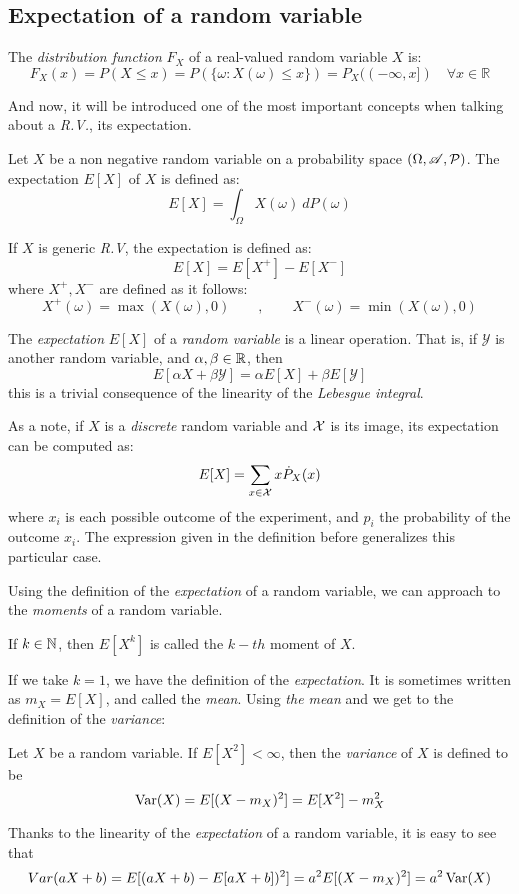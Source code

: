 \subsection{Expectation of a random variable}

\begin{ndef}
The \emph{distribution function } $F_X$ of a real-valued random variable $X$ is:
$$
F_X(x) = P(X \leq x) = P(\{\omega : X(\omega) \leq x\}) = P_X((-\infty,x]) \quad \forall x \in \mathbb R
$$
\end{ndef}

And now, it will be introduced one of the most important concepts when talking about a \emph{R.V.}, its expectation.

\begin{ndef}
Let $X$ be a non negative random variable on a probability space $(\Omega,\mathscr{A},\mathcal{P})$. The expectation $E[X]$ of $X$ is defined as:
$$
E[X] = \int_\Omega X(\omega) \ dP(\omega)
$$
\end{ndef}
If $X$ is generic \emph{R.V}, the expectation is defined as:
$$
E[X] = E[X^+] - E[X^-]
$$
where $X^+,X^-$ are defined as it follows:
$$
X^+(\omega) = \max(X(\omega),0) \quad \quad , \quad \quad X^-(\omega) = \min(X(\omega),0)
$$

The \emph{expectation} $E[X]$ of a \emph{random variable} is a linear operation. That is, if $\mathcal Y$ is another random variable, and $\alpha,\beta \in \mathbb{R}$, then
$$
E[\alpha X + \beta \mathcal Y] = \alpha E[X] + \beta E[\mathcal Y]
$$
this is a trivial consequence of the linearity of the \emph{Lebesgue integral}.

As a note, if $X$ is a \emph{discrete} random variable and $\mathcal{X}$ is its image, its expectation can be computed as:
$$
E[X] = \sum_{x \in \mathcal{X}} x \dot P_X(x)
$$
where $x_i$ is each possible outcome of the experiment, and $p_i$ the probability of the outcome $x_i$. The expression given in the definition before generalizes this particular case.

Using the definition of the \emph{expectation} of a random variable, we can approach to the \emph{moments} of a random variable.

\begin{ndef}
If $k \in \mathbb N$, then $E[X^k]$ is called the $k-th$ moment of $X$.
\end{ndef}
If we take $k = 1$, we have the definition of the \emph{expectation}. It is sometimes written as $m_X = E[X]$, and called the \emph{mean}. Using  \emph{the mean} and we get to the definition of the \emph{variance}:

\begin{ndef}
Let $X$ be a random variable. If $E[X^2] < \infty$, then the \emph{variance} of $X$ is defined to be
$$
\operatorname*{Var}(X) = E[(X - m_X)^2] = E[X^2] - m_X^2 
$$
\end{ndef}

Thanks to the linearity of the \emph{expectation} of a random variable, it is easy to see that
$$
Var(aX + b) = E[(aX + b) - E[aX + b])^2] = a^2E[(X - m_X)^2] = a^2 \operatorname*{Var}(X)
$$

